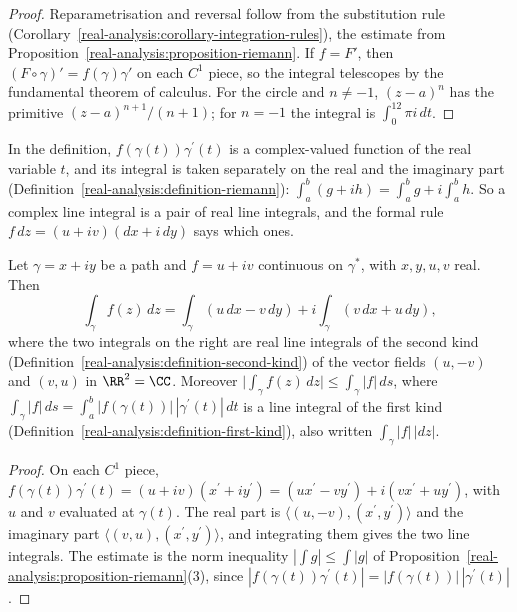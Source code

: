 \begin{proof}
Reparametrisation and reversal follow from the substitution rule (Corollary~\ref{real-analysis:corollary-integration-rules}), the estimate from
Proposition~\ref{real-analysis:proposition-riemann}. If $f = F'$, then $(F \circ \gamma)' = f(\gamma)\gamma'$ on each $C^1$ piece, so the integral telescopes by the fundamental theorem of calculus. For the
circle and $n \neq -1$, $(z - a)^n$ has the primitive $(z - a)^{n+1}/(n + 1)$; for $n = -1$ the integral is $\int_0^12\pi i\,dt$.
\end{proof}

In the definition, $f(\gamma(t))\gamma^{\prime}(t)$ is a complex-valued function of the real variable $t$, and its integral is taken separately on the real and the imaginary part
(Definition~\ref{real-analysis:definition-riemann}): $\int_a^b(g + ih) = \int_a^bg + i\int_a^bh$. So a complex line integral is a pair of real line integrals, and the formal rule
$f\,dz = (u + iv)(dx + i\,dy)$ says which ones.

\begin{proposition}\label{complex-analysis:proposition-path-integral-real}
Let $\gamma = x + iy$ be a path and $f = u + iv$ continuous on $\gamma^*$, with $x, y, u, v$ real. Then
\[
\int_\gamma f(z)\,dz = \int_\gamma(u\,dx - v\,dy) + i\int_\gamma(v\,dx + u\,dy),
\]
where the two integrals on the right are real line integrals of the second kind (Definition~\ref{real-analysis:definition-second-kind}) of the vector fields $(u, -v)$ and $(v, u)$ in $\RR^2 = \CC$. Moreover
$\bigl|\int_\gamma f(z)\,dz\bigr| \leq \int_\gamma|f|\,ds$, where $\int_\gamma|f|\,ds = \int_a^b|f(\gamma(t))|\,|\gamma^{\prime}(t)|\,dt$ is a line integral of the first kind
(Definition~\ref{real-analysis:definition-first-kind}), also written $\int_\gamma|f|\,|dz|$.
\end{proposition}

\begin{proof}
On each $C^1$ piece, $f(\gamma(t))\gamma^{\prime}(t) = (u + iv)(x^{\prime} + iy^{\prime}) = (ux^{\prime} - vy^{\prime}) + i(vx^{\prime} + uy^{\prime})$, with $u$ and $v$ evaluated at $\gamma(t)$. The real part is
$\langle(u, -v), (x^{\prime}, y^{\prime})\rangle$ and the imaginary part $\langle(v, u), (x^{\prime}, y^{\prime})\rangle$, and integrating them gives the two line integrals. The estimate is the norm inequality
$|\int g| \leq \int|g|$ of Proposition~\ref{real-analysis:proposition-riemann}(3), since $|f(\gamma(t))\gamma^{\prime}(t)| = |f(\gamma(t))|\,|\gamma^{\prime}(t)|$.
\end{proof}


